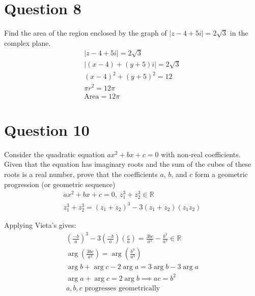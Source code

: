 \documentclass[12pt]{article}
\begin{document}
\section{Question 8}
Find the area of the region enclosed by the graph of $|z - 4 + 5i| = 2\sqrt{3}$ in the complex plane.
\begin{gather*}
    |z - 4 + 5i| = 2\sqrt{3}\\
    |(x-4)+(y+5)i|=2\sqrt{3}\\
    (x-4)^2+(y+5)^2=12\\
    \pi r^2=12\pi\\
    \boxed{\text{Area}=12\pi}
\end{gather*}

\section{Question 10}

Consider the quadratic equation $ax^2 + bx + c = 0$ with non-real coefficients. Given that the equation has imaginary roots and the sum of the cubes of these roots is a real number, prove that the coefficients $a$, $b$, and $c$ form a geometric progression (or geometric sequence)
\begin{gather*}
    ax^2+bx+c=0,\ z_1^3+z_2^3\in \mathbb{R}\\
    z_1^3+z_2^3=(z_1+z_2)^3-3(z_1+z_2)(z_1z_2)
\end{gather*}

Applying Vieta's gives:
\begin{gather*}
    (\frac{-b}{a})^3-3(\frac{-b}{a})(\frac{c}{a})=\frac{3bc}{a^2}-\frac{b^3}{a^3}\in \mathbb{R}\\
    \arg(\frac{3bc}{a^2})=\arg(\frac{b^3}{a^3})\\
    \arg b +\arg c - 2 \arg a=3 \arg b - 3 \arg a \\
    \arg a + \arg c = 2\arg b \implies ac=b^2 \\
    \boxed{a, b, c \text{ progresses geometrically}}
\end{gather*}
\end{document}

